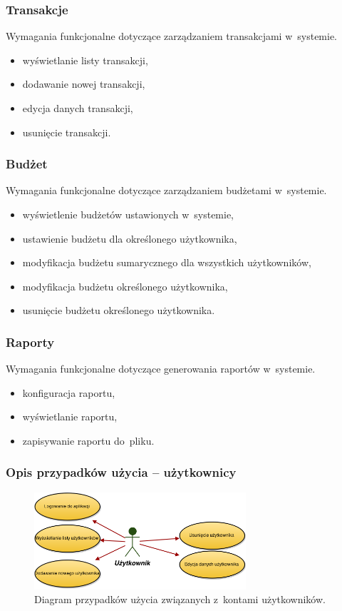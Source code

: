 \subsubsection{Transakcje}
Wymagania funkcjonalne dotyczące zarządzaniem transakcjami w~systemie.
\begin{itemize}
  \item wyświetlanie listy transakcji,
  \item dodawanie nowej transakcji,
  \item edycja danych transakcji,
  \item usunięcie transakcji.
\end{itemize}

\subsubsection{Budżet}
Wymagania funkcjonalne dotyczące zarządzaniem budżetami w~systemie.
\begin{itemize}
  \item wyświetlenie budżetów ustawionych w~systemie,
  \item ustawienie budżetu dla określonego użytkownika,
  \item modyfikacja budżetu sumarycznego dla wszystkich użytkowników,
  \item modyfikacja budżetu określonego użytkownika,
  \item usunięcie budżetu określonego użytkownika.
\end{itemize}

\subsubsection{Raporty}
Wymagania funkcjonalne dotyczące generowania raportów w~systemie.
\begin{itemize}
  \item konfiguracja raportu,
  \item wyświetlanie raportu,
  \item zapisywanie raportu do~pliku.
\end{itemize}

\subsubsection{Opis przypadków użycia -- użytkownicy}

\begin{figure}[H]
  \centering
  \includegraphics[width=0.7\textwidth]{images/przypadki_uzytkownik.png}
  \caption{Diagram przypadków użycia związanych z~kontami użytkowników.}
\end{figure}

